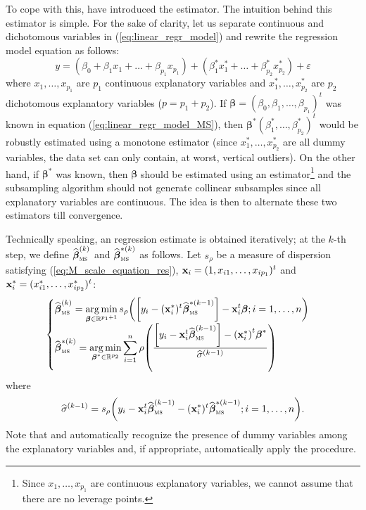 To cope with this, \citet{maronna:yohai:2000} have introduced the  estimator.
The intuition behind this estimator is simple. For the sake of clarity, let us
separate continuous and dichotomous variables in (\ref{eq:linear_regr_model})
and rewrite the regression model equation as follows:
%
\begin{equation}\label{eq:linear_regr_model_MS}
    y = (\beta_0 + \beta_1x_1 + \dots + \beta_{p_1}x_{p_1})
    + (\beta_1^*x_1^* + \dots + \beta_{p_2}^*x_{p_2}^*) + \varepsilon
\end{equation}
%
where $x_1, \dots, x_{p_1}$ are $p_1$ continuous explanatory variables and
$x_1^*, \dots, x_{p_2}^*$ are $p_2$ dichotomous explanatory variables ($p = p_1
+ p_2$). If $\boldsymbol\beta = (\beta_0, \beta_1, \dots, \beta_{p_1})^t$ was
known in equation (\ref{eq:linear_regr_model_MS}), then $\boldsymbol\beta^*%
(\beta_1^*, \dots, \beta_{p_2}^*)^t$ would be robustly estimated using a
monotone  estimator (since $x_1^*, \dots, x_{p_2}^*$ are all dummy
variables, the data set can only contain, at worst, vertical outliers). On the
other hand, if $\boldsymbol\beta^*$ was known, then $\boldsymbol\beta$ should
be estimated using an  estimator\footnote{Since $x_1, \dots, x_{p_1}$
are continuous explanatory variables, we cannot assume that there are no
leverage points.} and the subsampling algorithm should not generate collinear
subsamples since all explanatory variables are continuous. The idea is then to
alternate these two estimators till convergence.

Technically speaking, an  regression estimate is obtained iteratively;
at the $k$-th step, we define $\sthat{\boldsymbol\beta}_{\stsc{MS}}^{(k)}$ and
$\sthat{\boldsymbol\beta}_{\stsc{MS}}^{*(k)}$ as follows. Let $s_\rho$ be a
measure of dispersion satisfying (\ref{eq:M_scale_equation_res}), $\mathbf x_i
= (1, x_{i1}, \dots, x_{ip_1})^t$ and $\mathbf x_i^* = (x_{i1}^*, \dots,
x_{ip_2}^*)^t$:
\[
    \begin{cases}
        \sthat{\boldsymbol\beta}_{\stsc{MS}}^{(k)} 
        = \displaystyle\argmin_{\boldsymbol\beta \in \mathbb{R}^{p_1 + 1}}
        s_\rho\left(\left[y_{i} - (\stvec{x}_i^*)^t \sthat{\boldsymbol\beta}_{\stsc{MS}}^{*(k-1)}\right] 
        - \stvec{x}_i^t \boldsymbol\beta; i = 1, \dots, n\right)
        \\
        \sthat{\boldsymbol\beta}_{\stsc{MS}}^{*(k)} 
        = \displaystyle\argmin_{\boldsymbol\beta^* \in \mathbb{R}^{p_2}}
        \sum_{i=1}^{n} \rho\left(\frac{\left[y_i - \stvec{x}_i^t\sthat{\boldsymbol\beta}_{\stsc{MS}}^{(k-1)}\right] 
        - \left(\stvec{x}_i^*\right)^t \boldsymbol\beta^*}{\sthat{\sigma}^{(k-1)}}\right)
    \end{cases}
\]
where 
\[
    \sthat{\sigma}^{(k-1)} = s_\rho 
    \left(y_{i} - \stvec{x}_i^t \sthat{\boldsymbol\beta}_{\stsc{MS}}^{(k-1)}
    - (\stvec{x}_i^*)^t \sthat{\boldsymbol\beta}_{\stsc{MS}}^{*(k-1)}
    ; i = 1, \dots, n\right).
\]
Note that  and  automatically recognize the
presence of dummy variables among the explanatory variables and, if
appropriate, automatically apply the  procedure.

